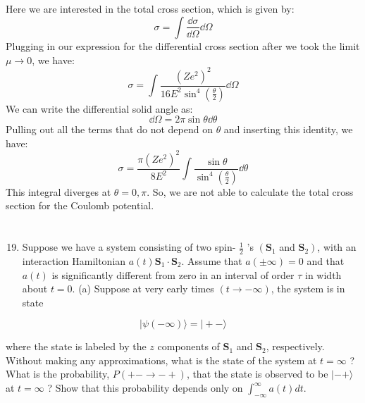 \documentclass[12pt]{article}
\begin{document}
\subsection{}
Here we are interested in the total cross section, which is given by:
\begin{equation}
  \sigma = \int \frac{\dd{\sigma}}{\dd{\Omega}}\dd{\Omega}
\end{equation}
Plugging in our expression for the differential cross section after we took the limit $\mu \rightarrow 0$, we have:
\begin{equation}
  \sigma = \int \frac{(Ze^2)^2}{16E^2\sin^4\left(\frac{\theta}{2}\right)}\dd{\Omega}
\end{equation}
We can write the differential solid angle as:
\begin{equation}
  \dd{\Omega} = 2\pi \sin\theta \dd{\theta}
\end{equation}
Pulling out all the terms that do not depend on $\theta$ and inserting this identity, we have:
\begin{equation}
  \sigma = \frac{\pi(Ze^2)^2}{8E^2}\int \frac{\sin\theta}{\sin^4\left(\frac{\theta}{2}\right)}\dd{\theta}
\end{equation}
This integral diverges at $\theta = 0, \pi$. So, we are not able to calculate the total cross section for the Coulomb potential.
\section{}
\begin{enumerate}
  \setcounter{enumi}{18}
  \item Suppose we have a system consisting of two spin- $\frac{1}{2}$ 's $\left(\mathbf{S}_{1}\right.$ and $\left.\mathbf{S}_{2}\right)$, with an interaction Hamiltonian $a(t) \mathbf{S}_{1} \cdot \mathbf{S}_{2}$. Assume that $a( \pm \infty)=0$ and that $a(t)$ is significantly different from zero in an interval of order $\tau$ in width about $t=0$.
(a) Suppose at very early times $(t \rightarrow-\infty)$, the system is in state
\end{enumerate}

$$
|\psi(-\infty)\rangle=|+-\rangle
$$

where the state is labeled by the $z$ components of $\mathbf{S}_{1}$ and $\mathbf{S}_{2}$, respectively. Without making any approximations, what is the state of the system at $t=\infty$ ? What is the probability, $P(+-\rightarrow-+)$, that the state is observed to be $|-+\rangle$ at $t=\infty$ ? Show that this probability depends only on $\int_{-\infty}^{\infty} a(t) d t$.
\end{document}
